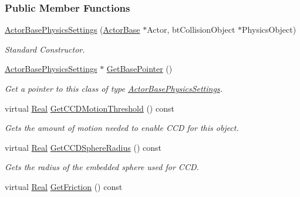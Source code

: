 \subsubsection*{Public Member Functions}
\begin{DoxyCompactItemize}
\item 
\hyperlink{classMezzanine_1_1ActorBasePhysicsSettings_a3f8d93a77d1d9a61314ef350a1c3394a}{ActorBasePhysicsSettings} (\hyperlink{classMezzanine_1_1ActorBase}{ActorBase} $\ast$Actor, btCollisionObject $\ast$PhysicsObject)
\begin{DoxyCompactList}\small\item\em Standard Constructor. \item\end{DoxyCompactList}\item 
\hyperlink{classMezzanine_1_1ActorBasePhysicsSettings}{ActorBasePhysicsSettings} $\ast$ \hyperlink{classMezzanine_1_1ActorBasePhysicsSettings_ae43e2938e30b69ac11627b9648c43415}{GetBasePointer} ()
\begin{DoxyCompactList}\small\item\em Get a pointer to this class of type \hyperlink{classMezzanine_1_1ActorBasePhysicsSettings}{ActorBasePhysicsSettings}. \item\end{DoxyCompactList}\item 
virtual \hyperlink{namespaceMezzanine_a726731b1a7df72bf3583e4a97282c6f6}{Real} \hyperlink{classMezzanine_1_1ActorBasePhysicsSettings_a804941eb77d960dd3c73d331c47c891c}{GetCCDMotionThreshold} () const 
\begin{DoxyCompactList}\small\item\em Gets the amount of motion needed to enable CCD for this object. \item\end{DoxyCompactList}\item 
virtual \hyperlink{namespaceMezzanine_a726731b1a7df72bf3583e4a97282c6f6}{Real} \hyperlink{classMezzanine_1_1ActorBasePhysicsSettings_a3729e8ee88bc2d8892d921016aa4a4c0}{GetCCDSphereRadius} () const 
\begin{DoxyCompactList}\small\item\em Gets the radius of the embedded sphere used for CCD. \item\end{DoxyCompactList}\item 
virtual \hyperlink{namespaceMezzanine_a726731b1a7df72bf3583e4a97282c6f6}{Real} \hyperlink{classMezzanine_1_1ActorBasePhysicsSettings_ac59b0dfaf123ddfb3b70e35284502f56}{GetFriction} () const 

\end{DoxyCompactItemize}
